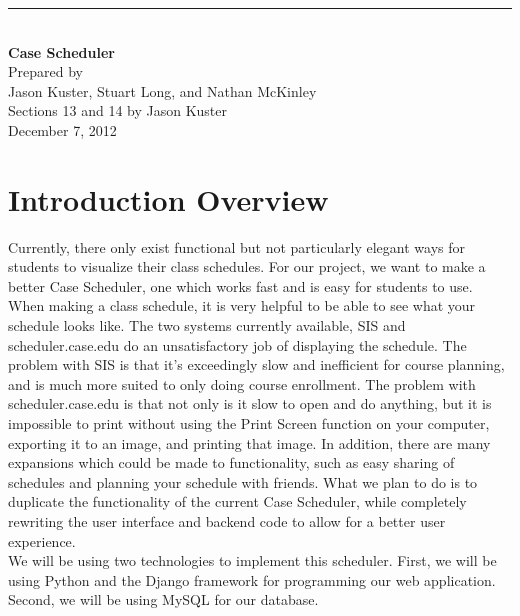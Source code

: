 \documentclass[pdftex,12pt,letter]{article}
\newcommand{\HRule}{\rule{\linewidth}{0.5mm}}
\begin{document}
\begin{titlepage}
\begin{flushright}
\HRule \\
{\huge \bfseries Case Scheduler\\[4cm]}
{\large Prepared by\\Jason Kuster, Stuart Long, and Nathan McKinley\\Sections 13 and 14 by Jason Kuster\\[1cm]
December 7, 2012}
\end{flushright}
\end{titlepage}
\tableofcontents{}
\newpage
\section{Introduction Overview}
Currently, there only exist functional but not particularly elegant ways for students to visualize their class schedules. For our project, we want to make a better Case Scheduler, one which works fast and is easy for students to use.\\

\noindent When making a class schedule, it is very helpful to be able to see what your schedule looks like. The two systems currently available, SIS and scheduler.case.edu do an unsatisfactory job of displaying the schedule. The problem with SIS is that it's exceedingly slow and inefficient for course planning, and is much more suited to only doing course enrollment. The problem with scheduler.case.edu is that not only is it slow to open and do anything, but it is impossible to print without using the Print Screen function on your computer, exporting it to an image, and printing that image. In addition, there are many expansions which could be made to functionality, such as easy sharing of schedules and planning your schedule with friends. What we plan to do is to duplicate the functionality of the current Case Scheduler, while completely rewriting the user interface and backend code to allow for a better user experience.\\

\noindent We will be using two technologies to implement this scheduler. First, we will be using Python and the Django framework for programming our web application. Second, we will be using MySQL for our database.
\end{document}
